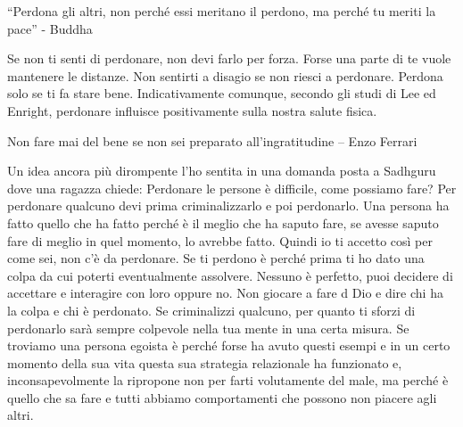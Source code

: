 \documentclass[12pt]{book} %
\begin{document}
“Perdona gli altri, non perché essi meritano il perdono, ma perché tu meriti la pace” - Buddha

Se non ti senti di perdonare, non devi farlo per forza. Forse una parte di te vuole mantenere le distanze. Non
sentirti a disagio se non riesci a perdonare. Perdona solo se ti fa stare bene. Indicativamente comunque, secondo gli studi di Lee ed Enright, perdonare influisce
positivamente sulla nostra salute fisica.

Non fare mai del bene se non sei preparato all'ingratitudine – Enzo Ferrari

Un idea ancora più dirompente l'ho sentita in una domanda posta a Sadhguru dove una ragazza chiede: Perdonare le persone è difficile, come possiamo fare?
Per perdonare qualcuno devi prima criminalizzarlo e poi perdonarlo. 
Una persona ha fatto quello che ha fatto perché è il meglio che ha saputo fare, se avesse saputo fare di meglio in quel momento, lo avrebbe fatto. Quindi io ti accetto così per come sei, non c'è da perdonare. Se ti perdono è perché prima ti ho dato una colpa da cui poterti eventualmente assolvere. Nessuno è perfetto, puoi decidere di accettare e interagire con loro oppure no. Non giocare a fare d
Dio e dire chi ha la colpa e chi è perdonato. Se criminalizzi qualcuno, per quanto ti sforzi di perdonarlo sarà sempre colpevole nella tua mente in una certa misura.
Se troviamo una persona egoista è perché forse ha avuto questi esempi e in un certo momento della sua vita questa sua strategia relazionale ha funzionato e, inconsapevolmente la ripropone non per farti volutamente del male, ma perché è quello che sa fare e tutti abbiamo comportamenti che possono non piacere agli altri.
\end{document}
